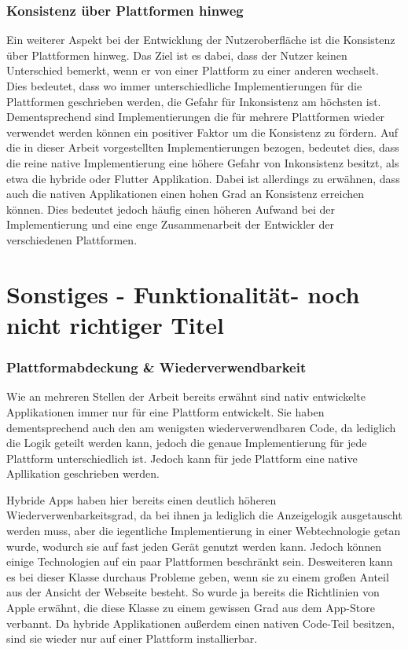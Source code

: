 \subsubsection{Konsistenz über Plattformen hinweg}
Ein weiterer Aspekt bei der Entwicklung der Nutzeroberfläche ist die Konsistenz über Plattformen hinweg. Das Ziel ist es dabei, dass der Nutzer keinen Unterschied bemerkt, wenn er von einer Plattform zu einer anderen wechselt. 
Dies bedeutet, dass wo immer unterschiedliche Implementierungen für die Plattformen geschrieben werden, die Gefahr für Inkonsistenz am höchsten ist.
Dementsprechend sind Implementierungen die für mehrere Plattformen wieder verwendet werden können ein positiver Faktor um die Konsistenz zu fördern.
Auf die in dieser Arbeit vorgestellten Implementierungen bezogen, bedeutet dies, dass die reine native Implementierung eine höhere Gefahr von Inkonsistenz besitzt, als etwa die hybride oder Flutter Applikation.
Dabei ist allerdings zu erwähnen, dass auch die nativen Applikationen einen hohen Grad an Konsistenz erreichen können. Dies bedeutet jedoch häufig einen höheren Aufwand bei der Implementierung und eine enge Zusammenarbeit der Entwickler der verschiedenen Plattformen.

\section{Sonstiges - Funktionalität- noch nicht richtiger Titel}

\subsubsection{Plattformabdeckung \& Wiederverwendbarkeit}
Wie an mehreren Stellen der Arbeit bereits erwähnt sind nativ entwickelte Applikationen immer nur für eine Plattform entwickelt. Sie haben dementsprechend auch den am wenigsten wiederverwendbaren Code, da lediglich die Logik geteilt werden kann, jedoch die genaue Implementierung für jede Plattform unterschiedlich ist. Jedoch kann für jede Plattform eine native Apllikation geschrieben werden.

Hybride Apps haben hier bereits einen deutlich höheren Wiederverwenbarkeitsgrad, da bei ihnen ja lediglich die Anzeigelogik ausgetauscht werden muss, aber die iegentliche Implementierung in einer Webtechnologie getan wurde, wodurch sie auf fast jeden Gerät genutzt werden kann. Jedoch können einige Technologien auf ein paar Plattformen beschränkt sein. Desweiteren kann es bei dieser Klasse durchaus Probleme geben, wenn sie zu einem großen Anteil aus der Ansicht der Webseite besteht. So wurde ja bereits die Richtlinien von Apple erwähnt, die diese Klasse zu einem gewissen Grad aus dem App-Store verbannt. Da hybride Applikationen außerdem einen nativen Code-Teil besitzen, sind sie wieder nur auf einer Plattform installierbar. 

